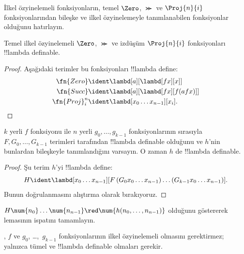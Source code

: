 


İlkel özyinelemeli fonksiyonların, temel $\Zero$, $\Succ$ ve $\Proj{n}{i}$
fonksiyonlarından bileşke ve ilkel özyinelemeyle tanımlanabilen fonksiyonlar
olduğunu hatırlayın.

\begin{lem}
  Temel ilkel özyinelemeli $\Zero$, $\Succ$ ve izdüşüm $\Proj{n}{i}$
  fonksiyonları !!{lambda definable}.
\end{lem}

\begin{proof}
Aşağıdaki terimler bu fonksiyonları !!{lambda define}:
\begin{align*}
  \fn{Zero} & \ident \lambd[a][\lambd[fx][x]]\\
  \fn{Succ} & \ident \lambd[a][\lambd[fx][f (a f x)]] \\
  \fn{Proj}^n_i & \ident \lambd[x_0\dots x_{n-1}][x_i].
\end{align*}
\end{proof}

\begin{lem}
   $k$ yerli $f$ fonksiyonu ile $n$ yerli
  $g_0,\dots,g_{k-1}$ fonksiyonlarının sırasıyla
  $F,G_0,\dots,G_{k-1}$ terimleri tarafından !!{lambda definable}
  olduğunu ve $h$'nin bunlardan bileşkeyle tanımlandığını varsayın. O zaman
  $h$ de !!{lambda definable}.
\end{lem}

\begin{proof}
  Şu terim $h$'yi !!{lambda define}:
  \[
  H \ident \lambd[x_0 \dots x_{n-1}][F\, (G_0 x_0 \dots
    x_{n-1}) \dots (G_{k-1} x_0 \dots x_{n-1})].
  \]
  Bunun doğrulanmasını alıştırma olarak bırakıyoruz.
\end{proof}

\begin{prob}
  $H\num{n_0}\dots\num{n_{n-1}}\red
  \num{h(n_0,\dots,n_{n-1})}$ olduğunu göstererek
   lemasının ispatını tamamlayın.
\end{prob}

, $f$ ve $g_0$, \dots,~$g_{k-1}$ fonksiyonlarının ilkel
özyinelemeli olmasını gerektirmez; yalnızca tümel ve !!{lambda definable}
olmaları gerekir.

